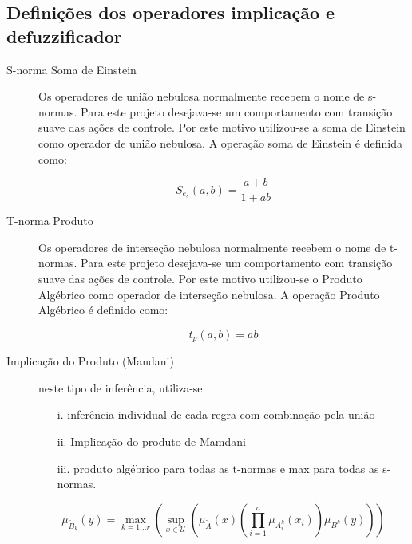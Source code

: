         \subsection{Definições dos operadores implicação e defuzzificador}
            \begin{description}
                \item [S-norma Soma de Einstein] Os operadores de união nebulosa normalmente recebem o nome de s-normas. Para este projeto desejava-se um comportamento com transição suave das ações de controle. Por este motivo utilizou-se a soma de Einstein como operador de união nebulosa. A operação soma de Einstein é definida como:
    
                \begin{equation*}
                    S_{e_s}(a,b)=\frac{a+b}{1+ab}
                \end{equation*}
    
                \item [T-norma Produto] Os operadores de interseção nebulosa normalmente recebem o nome de t-normas. Para este projeto desejava-se um comportamento com transição suave das ações de controle. Por este motivo utilizou-se o Produto Algébrico como operador de interseção nebulosa. A operação Produto Algébrico é definido como:
    
                \begin{equation*}
                    t_p(a,b)=ab
                \end{equation*}
                
                \item [Implicação do Produto (Mandani)] neste tipo de inferência, utiliza-se: 
                    \begin{itemize}
                        \item [i.] inferência individual de cada regra com combinação pela união
                        \item [ii.] Implicação do produto de Mamdani
                        \item [iii.] produto algébrico para todas as t-normas e max para todas as s-normas.
                    \end{itemize}
    
                    \begin{equation*}
                        \mu_{\tilde{B}_k}(y)=  \max\limits_{k=1\hdots r} \left( \sup\limits_{ x \in \mathcal{U}} \left( \mu_{\tilde{A}}(x)\left( \prod_{i=1}^{n} \mu_{A^k_i}(x_i)  \right) \mu_{B^k}(y)\right) \right)
                    \end{equation*}
                    

\end{description}
